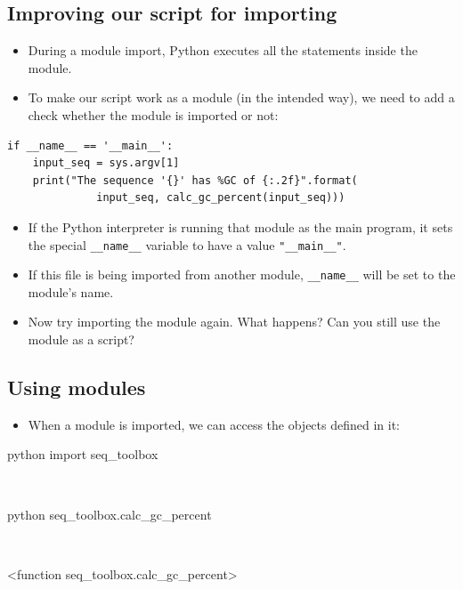 \documentclass[aspectratio=1610,slidestop]{beamer}
\begin{document}
\subsection{Improving our script for importing}
\begin{pframe}
 \vspace{-.05cm}
 \begin{itemize}
  \item During a module import, Python executes all the statements inside the
  module.
  \item To make our script work as a module (in the intended way), we need to
  add a check whether the module is imported or not:
 \end{itemize}
 \vspace{-0.3cm}
 \begin{pythoncode}
   \begin{verbatim}
if __name__ == '__main__':
    input_seq = sys.argv[1]
    print("The sequence '{}' has %GC of {:.2f}".format(
              input_seq, calc_gc_percent(input_seq)))
   \end{verbatim}
 \end{pythoncode}
 \begin{itemize}
  \item If the Python interpreter is running that module as the main program,
  it sets the special \texttt{__name__} variable to have a value
  \texttt{"__main__"}.
  \item If this file is being imported from another module,
  \texttt{__name__} will be set to the module's name.
  \item Now try importing the module again. What happens? Can you still use the
  module as a script?
 \end{itemize}
\end{pframe}


\subsection{Using modules}
\begin{pframe}
 \begin{itemize}
  \item When a module is imported, we can access the objects defined in it:
 \end{itemize}
 \vspace{-0.3cm}
 \begin{ipython}
   \begin{pythonin}{python}
import seq_toolbox
   \end{pythonin}
   \\
   \begin{pythonin}{python}
seq_toolbox.calc_gc_percent
   \end{pythonin}
   \\
   \begin{pythonout}
<function seq\_toolbox.calc\_gc\_percent>
   \end{pythonout}
 \end{ipython}
\end{pframe}
\end{document}
